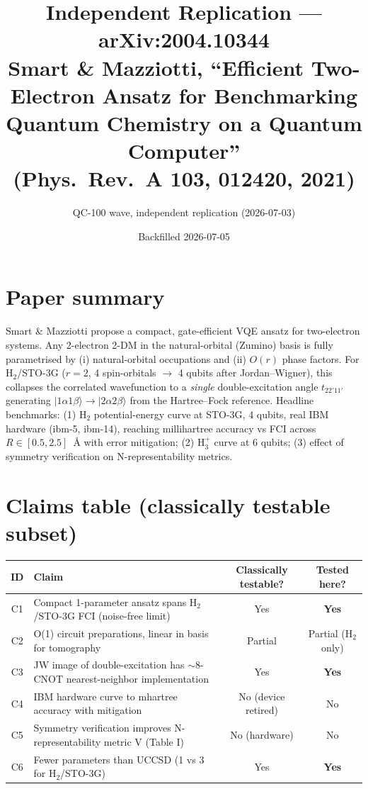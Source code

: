 \documentclass[11pt]{article}
\title{Independent Replication --- arXiv:2004.10344\\
\large Smart \& Mazziotti, ``Efficient Two-Electron Ansatz for Benchmarking Quantum Chemistry on a Quantum Computer''\\
(Phys.\ Rev.\ A \textbf{103}, 012420, 2021)}
\author{QC-100 wave, independent replication (2026-07-03)}
\date{Backfilled 2026-07-05}
\begin{document}
\maketitle

\section{Paper summary}
Smart \& Mazziotti propose a compact, gate-efficient VQE ansatz for two-electron
systems. Any 2-electron 2-DM in the natural-orbital (Zumino) basis is fully
parametrised by (i) natural-orbital occupations and (ii) $O(r)$ phase factors.
For H$_2$/STO-3G ($r{=}2$, 4 spin-orbitals $\to$ 4 qubits after Jordan--Wigner),
this collapses the correlated wavefunction to a \emph{single} double-excitation
angle $t_{22'11'}$ generating $|1\alpha 1\beta\rangle \to |2\alpha 2\beta\rangle$
from the Hartree--Fock reference. Headline benchmarks: (1) H$_2$ potential-energy
curve at STO-3G, 4 qubits, real IBM hardware (ibm-5, ibm-14), reaching millihartree
accuracy vs FCI across $R\in[0.5,2.5]$~\AA{} with error mitigation; (2) H$_3^+$
curve at 6 qubits; (3) effect of symmetry verification on N-representability
metrics.

\section{Claims table (classically testable subset)}
\begin{center}\small
\begin{tabular}{clcc}
\toprule
ID & Claim & Classically testable? & Tested here?\\
\midrule
C1 & Compact 1-parameter ansatz spans H$_2$/STO-3G FCI (noise-free limit) & Yes & \textbf{Yes} \\
C2 & O(1) circuit preparations, linear in basis for tomography & Partial & Partial (H$_2$ only)\\
C3 & JW image of double-excitation has $\sim$8-CNOT nearest-neighbor implementation & Yes & \textbf{Yes} \\
C4 & IBM hardware curve to mhartree accuracy with mitigation & No (device retired) & No\\
C5 & Symmetry verification improves N-representability metric V (Table I) & No (hardware) & No\\
C6 & Fewer parameters than UCCSD (1 vs 3 for H$_2$/STO-3G) & Yes & \textbf{Yes} \\
\bottomrule
\end{tabular}
\end{center}
\end{document}
